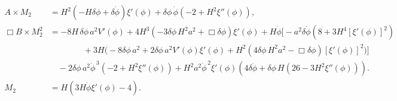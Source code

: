 \documentclass[reprint, 10pt, amsmath, amssymb, floatfix, aps, prd, superscriptaddress, nofootinbib, nobibnotes,twocolumn]{revtex4-1}
\begin{document}
\begin{widetext}
    \begin{align}
        A \times M_2 & = H^2\left(-H\delta\phi+\delta\dot\phi\right)\xi'(\phi)+\delta\phi\,\dot{\phi}\left(-2+H^2\xi''(\phi)\right),\label{eq:gb-pert-a-eom}\\
        \Box B \times M_2^2 & = -8H\,\delta\phi\,a^2V'(\phi)+4H^3\left(-3\delta\phi\,H^2a^2+\Box\delta\phi\right)\xi'(\phi)+H\dot{\phi}\Bigg[-a^2\delta\dot\phi\left(8+3H^4\left[\xi'(\phi)\right]^2\right)
        \nonumber\\
        &\qquad\qquad+3H\Bigg(-8\delta\phi\,a^2+2\delta\phi\,a^2 V'(\phi)\xi'(\phi)+H^2
        \left(4\delta\phi\,H^2a^2-\Box\delta\phi\right)\left[\xi'(\phi)\right]^2\Bigg)\Bigg]
        \nonumber\\
        &\quad-2\delta\phi\,a^2\dot{\phi}^{\,3}\left(-2+H^2\xi''(\phi)\right)+H^2a^2\dot{\phi}^{\,2}\xi'(\phi)\left(4\delta\dot\phi+\delta\phi\,H\left(26-3H^2\xi''(\phi)\right)\right).\label{eq:gb-pert-b-eom}\\
        M_2 & = H (3H\dot\phi\xi'(\phi) - 4).
    \end{align}
\end{widetext}


\end{document}
